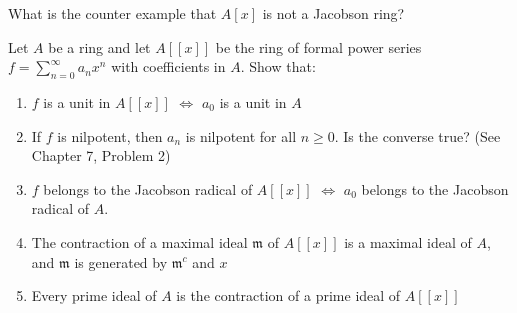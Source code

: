\documentclass{solution}
\begin{document}
\TODO What is the counter example that $A[x]$ is not a Jacobson ring?

\begin{problem}{5}
    Let $A$ be a ring and let $A[[x]]$ be the ring of formal power series $f = \sum\limits_{n = 0}^{\infty} a_n x^n$ with coefficients in $A$. Show that:
    \begin{enumerate}
        \item $f$ is a unit in $A[[x]]$ $\Leftrightarrow$ $a_0$ is a unit in $A$
        \item If $f$ is nilpotent, then $a_n$ is nilpotent for all $n \ge 0$. Is the converse true? (See Chapter 7, Problem 2)
        \item $f$ belongs to the Jacobson radical of $A[[x]]$ $\Leftrightarrow$ $a_0$ belongs to the Jacobson radical of $A$.
        \item The contraction of a maximal ideal $\mathfrak{m}$ of $A[[x]]$ is a maximal ideal of $A$, and $\mathfrak{m}$ is generated by $\mathfrak{m}^c$ and $x$
        \item Every prime ideal of $A$ is the contraction of a prime ideal of $A[[x]]$
    \end{enumerate}
\end{problem}
\end{document}
